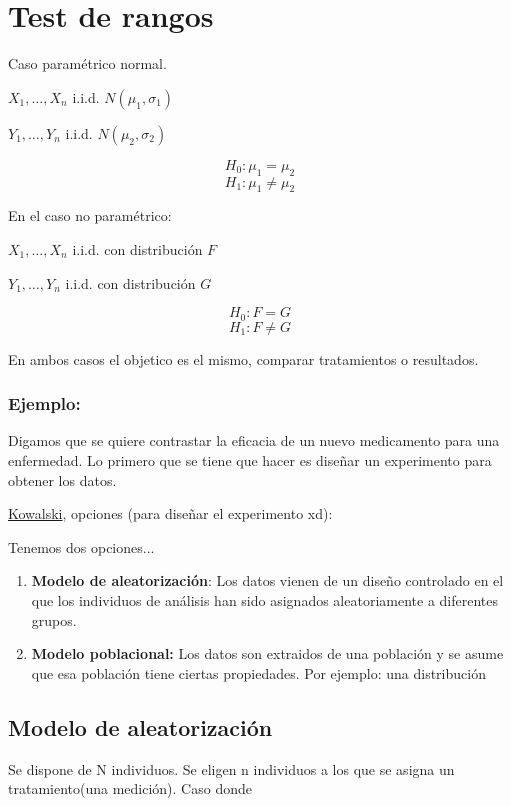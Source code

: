 \section{Test de rangos}

Caso paramétrico normal.

$X_1,\dots,X_n$ i.i.d. $N(\mu_1,\sigma_1)$

$Y_1,\dots,Y_n$ i.i.d. $N(\mu_2,\sigma_2)$

\[
    H_0:\mu_1=\mu_2
\]
\[
    H_1: \mu_1 \neq \mu_2
\]

En el caso no paramétrico:

$X_1,\dots,X_n$ i.i.d. con distribución $F$

$Y_1,\dots,Y_n$ i.i.d. con distribución $G$

\[
    H_0:F=G
\]
\[
    H_1: F \neq G
\]

En ambos casos el objetico es el mismo, comparar tratamientos o resultados.

\subsubsection*{Ejemplo:} 
Digamos que se quiere contrastar la eficacia de un nuevo medicamento para una enfermedad.
Lo primero que se tiene que hacer es diseñar un experimento para obtener los datos.

\begin{center}
    \href{https://media.tenor.com/lsbTX_Avt2AAAAAM/brushing-teeth-kowalski.gif}{Kowalski}, opciones (para diseñar el experimento xd):
\end{center}

\noindent Tenemos dos opciones...
\begin{enumerate}
    \item \textbf{Modelo de aleatorización}: Los datos vienen de un diseño controlado en el que los 
    individuos de análisis han sido asignados aleatoriamente a diferentes grupos.
    \item \textbf{Modelo poblacional:} Los datos son extraidos de una población y se asume que esa población tiene ciertas propiedades. 
    Por ejemplo: una distribución
\end{enumerate}

\subsection{Modelo de aleatorización}

Se dispone de N individuos. Se eligen n individuos a los que se asigna un tratamiento(una medición).
Caso donde

